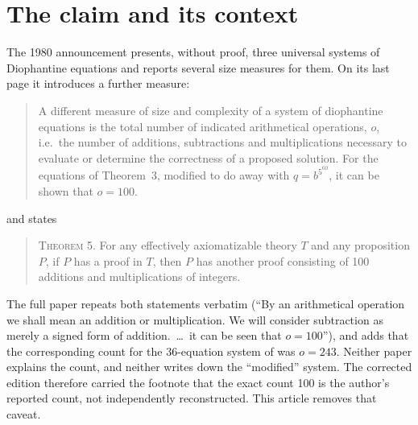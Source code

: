 \documentclass[11pt,letterpaper]{article}
\theoremstyle{definition}
\theoremstyle{remark}
\numberwithin{equation}{section}
\begin{document}
\begin{abstract}
(iii)~\emph{Theorem 5.} With these certificate bounds, Theorem~5 follows from
Theorem~3 by the standard passage from an effectively axiomatizable theory
to a recursively enumerable set of G\"odel numbers; we spell this out and
state exactly what the ``proof'' of Theorem~5 is and what it is not.

(iv)~\emph{How the count arose.} Quotations from the 1976, 1978, 1980 and
1982 papers show that $o$ was defined as the number of operations
``necessary to write the system'', ``very closely associated with the
number of symbols'', that is, as typographical complexity; the
proof-theoretic reading was attached to that number afterwards and the
convention was inherited from the 1976 primality bound, where the two
counts coincide.
\end{abstract}

\section{The claim and its context}

The 1980 announcement \cite{J80} presents, without proof, three universal
systems of Diophantine equations and reports several size measures for them.
On its last page it introduces a further measure:

\begin{quote}\small
A different measure of size and complexity of a system of diophantine
equations is the total number of indicated arithmetical operations, $o$, i.e.\
the number of additions, subtractions and multiplications necessary to
evaluate or determine the correctness of a proposed solution. For the
equations of Theorem~3, modified to do away with $q=b^{5^{60}}$, it can be
shown that $o=100$.
\end{quote}

\noindent and states

\begin{quote}\small
\textsc{Theorem 5.} For any effectively axiomatizable theory $T$ and any
proposition $P$, if $P$ has a proof in $T$, then $P$ has another proof
consisting of 100 additions and multiplications of integers.
\end{quote}

\noindent The full paper \cite{J82} repeats both statements verbatim
(``By an arithmetical operation we shall mean an addition or multiplication.
We will consider subtraction as merely a signed form of addition.\ \ldots\ it
can be seen that $o=100$''), and adds that the corresponding count for the
36-equation system of \cite{J78} was $o=243$. Neither paper explains the
count, and neither writes down the ``modified'' system. The corrected
edition therefore carried the footnote that the exact count 100 is the
author's reported count, not independently reconstructed. This article
removes that caveat.
\end{document}
